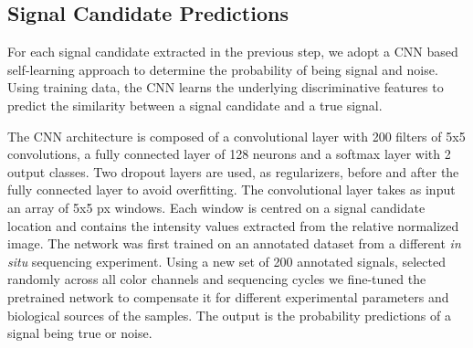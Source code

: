\documentclass[10pt,journal]{IEEEtran}
\begin{document}
\subsection{Signal Candidate Predictions}
For each signal candidate extracted in the previous step, we adopt a CNN based self-learning approach to determine the probability of being signal and noise. Using training data, the CNN learns the underlying discriminative features to predict the similarity between a signal candidate and a true signal.


The CNN architecture is composed of a convolutional layer with 200 filters of 5x5 convolutions, a fully connected layer of 128 neurons and a softmax layer with 2 output classes. Two dropout layers are used, as regularizers, before and after the fully connected layer to avoid overfitting.
The convolutional layer takes as input an array of 5x5 px windows. Each window is centred on a signal candidate location and contains the intensity values extracted from the relative normalized image.
The network was first trained on an annotated dataset from a different \textit{in situ} sequencing experiment. Using a new set of 200 annotated signals,
selected randomly across all color channels and sequencing cycles
we fine-tuned the pretrained network to compensate it for different experimental parameters and biological sources of the samples. The output is the probability predictions of a signal being true or noise.
\end{document}
